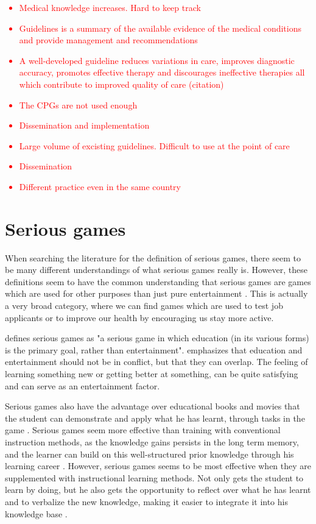 \textcolor{red}{\begin{itemize}
	\item Medical knowledge increases. Hard to keep track
	\item Guidelines is a summary of the available evidence of the medical conditions and provide management and recommendations
	\item A well-developed guideline reduces
	variations in care, improves diagnostic accuracy,
	promotes effective therapy and discourages ineffective
	therapies all which contribute to improved
	quality of care (citation)
	\item The CPGs are not used enough
	\item Dissemination and implementation
	\item Large volume of excisting guidelines. Difficult to use at the point of care
	\item Dissemination
	\item Different practice even in the same country
\end{itemize}}
\section{Serious games}
When searching the literature for the definition of serious games, there seem to be many different understandings of what serious games really is. However, these definitions seem to have the common understanding that serious games are games which are used for other purposes than just pure entertainment \parencite{Susi2015}. This is actually a very broad category, where we can find games which are used to test job applicants or to improve our health by encouraging us stay more active.

\textcite{Michael2006} defines serious games as "a serious game in which education (in its various forms) is the primary goal, rather than entertainment". \textcite{Michael2006} emphasizes that education and entertainment should not be in conflict, but that they can overlap. The feeling of learning something new or getting better at something, can be quite satisfying and can serve as an entertainment factor.

Serious games also have the advantage over educational books and movies that the student can demonstrate and apply what he has learnt, through tasks in the game \parencite{Michael2006}.    Serious games seem more effective than training with conventional instruction methods, as the knowledge gains persists in the long term memory, and the learner can build on this well-structured prior knowledge through his learning career \parencite{Wouters2013}. However, serious games seems to be most effective when they are supplemented with instructional learning methods. Not only gets the student to learn by doing, but he also gets the opportunity to reflect over what he has learnt and to verbalize the new knowledge, making it easier to integrate it into his knowledge base \parencite{Wouters2013}. 



